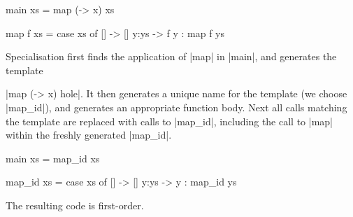 \documentclass[preprint]{sigplanconf}
\begin{document}
\begin{example}
\label{ex:map_id}
\begin{code}
main xs = map (\x -> x) xs

map f xs = case  xs of
                 []    -> []
                 y:ys  -> f y : map f ys
\end{code}

Specialisation first finds the application of |map| in |main|, and generates the template \ignore|map (\x -> x) hole|. It then generates a unique name for the template (we choose |map_id|), and generates an appropriate function body. Next all calls matching the template are replaced with calls to |map_id|, including the call to |map| within the freshly generated |map_id|.

\begin{code}
main xs = map_id xs

map_id xs = case  xs of
                  []    -> []
                  y:ys  -> y : map_id ys
\end{code}

\noindent The resulting code is first-order.
\end{example}

\begin{comment}
\begin{figure}

\begin{code}
shouldSpecialise :: Expr -> Bool
shouldSpecialise (EFun f xs_) = any (\x -> isLambda x || isBox x) (universe (EFun f xs_))
shouldSpecialise _ = False

abstractTemplate :: Expr -> Expr
abstractTemplate x =
    transform (\x -> if abstract x then hole else x) $
    abstractVars (freeVars x) x

abstract :: Expr -> Bool
abstract (ECon c xs_) = all abstract xs_
abstract (EFun f xs_) = all abstract xs_
abstract (EApp x xs_) = all abstract xs_
abstract (ELet v x y) = abstract x && abstract (abstractVars [v] y)
abstract (ECase x alts_) = abstract x && all alt alts_
   where alt (EAlt c vs_ x) = abstract (abstractVars vs_ x)
abstract x = (x == hole)

abstractVars :: [VarName] -> Expr -> Expr
abstractVars vs x = ellipses
    -- replace the variables |vs| in |x| with |abstract|
    -- respecting variables rebound locally
\end{code}
\caption{Template generation function.}
\label{fig:template_generation}
\end{figure}
\end{comment}
\end{document}
